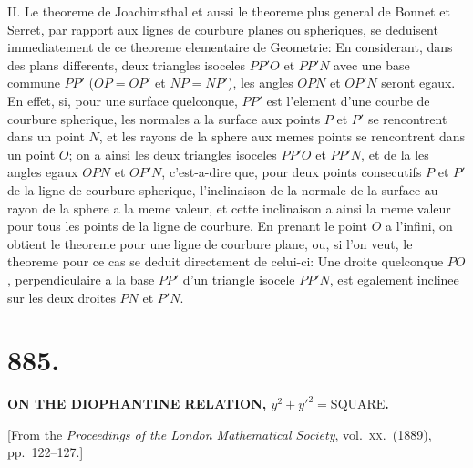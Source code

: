 \documentclass[11pt,a4paper]{article}
\theoremstyle{plain}
\theoremstyle{definition}
\begin{document}
\textsc{II.} Le theoreme de Joachimsthal et aussi le theoreme plus general de Bonnet et Serret, par rapport aux lignes de courbure planes ou spheriques, se deduisent immediatement de ce theoreme elementaire de Geometrie: En considerant, dans des plans differents, deux triangles isoceles $PP'O$ et $PP'N$ avec une base commune $PP'$ ($OP = OP'$ et $NP = NP'$), les angles $OPN$ et $OP'N$ seront egaux. En effet, si, pour une surface quelconque, $PP'$ est l'element d'une courbe de courbure spherique, les normales a la surface aux points $P$ et $P'$ se rencontrent dans un point $N$, et les rayons de la sphere aux memes points se rencontrent dans un point $O$; on a ainsi les deux triangles isoceles $PP'O$ et $PP'N$, et de la les angles egaux $OPN$ et $OP'N$, c'est-a-dire que, pour deux points consecutifs $P$ et $P'$ de la ligne de courbure spherique, l'inclinaison de la normale de la surface au rayon de la sphere a la meme valeur, et cette inclinaison a ainsi la meme valeur pour tous les points de la ligne de courbure. En prenant le point $O$ a l'infini, on obtient le theoreme pour une ligne de courbure plane, ou, si l'on veut, le theoreme pour ce cas se deduit directement de celui-ci: Une droite quelconque $PO$, perpendiculaire a la base $PP'$ d'un triangle isocele $PP'N$, est egalement inclinee sur les deux droites $PN$ et $P'N$.


\newpage
\section*{885.}

\begin{center}
\textbf{ON THE DIOPHANTINE RELATION, $y^2 + y'^2 = \text{SQUARE}$.}
\end{center}

\begin{center}
[From the \textit{Proceedings of the London Mathematical Society}, vol.\ \textsc{xx}.\ (1889), pp.\ 122--127.]
\end{center}
\end{document}

